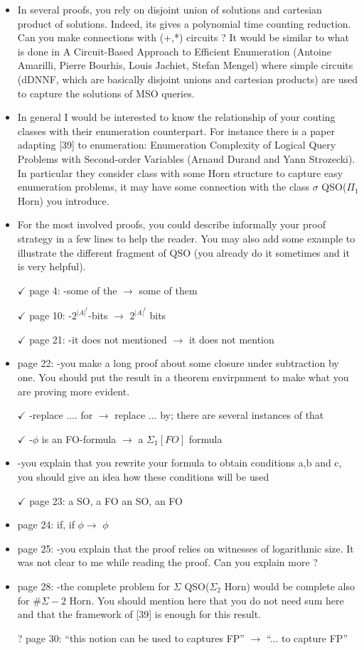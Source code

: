 \documentclass[a4paper]{article}
\begin{document}
\begin{itemize}
	\setlength\itemsep{0.5em}
	\item In several proofs, you rely on disjoint union of solutions and cartesian product of solutions. Indeed, its gives a polynomial time counting reduction. Can you make connections with (+,*) circuits ? It would be similar to what is done in A Circuit-Based Approach to Efficient Enumeration (Antoine Amarilli, Pierre Bourhis, Louis Jachiet, Stefan Mengel) where simple circuits (dDNNF, which are basically disjoint unions and cartesian products) are used to capture the solutions of MSO queries.
	
	\item In general I would be interested to know the relationship of your couting classes with their enumeration counterpart. 
	For instance there is a paper adapting [39] to enumeration: Enumeration Complexity of Logical Query Problems with Second-order Variables (Arnaud Durand and Yann Strozecki). In particular they consider class with some Horn structure to capture easy enumeration problems, it may have some connection with the class $\sigma$ QSO($\Pi_1$ Horn) you introduce.
	
	\item For the most involved proofs, you could describe informally your proof strategy in a few lines to help the reader. You may also add some example to illustrate the different fragment of QSO (you already do it sometimes and it is very helpful).
	
	\item[$\checkmark$] page 4:
	-some of the $\to$ some of them 
	\item[$\checkmark$] page 10: 
	-$2^{|A|^l}$-bits $\to$ $2^{|A|^l}$ bits
	\item[$\checkmark$] page 21:
	-it does not mentioned $\to$ it does not mention
	\item page 22: 
	-you make a long proof about some closure under subtraction by one.
	You should put the result in a theorem envirpnment to make what you are
	proving more evident.
	\item[$\checkmark$] -replace .... for $\to$ replace ... by;  there are several instances of
	that
	\item[$\checkmark$] -$\phi$ is an FO-formula $\to$ a $\Sigma_1[FO]$ formula
	\item -you explain that you rewrite your formula to obtain conditions a,b and c, 
	you should give an idea how these conditions will be used
	\item[$\checkmark$] page 23:
	a SO, a FO  an SO, an FO
	\item page 24: 
	if, if $\phi$$\to$ $\phi$
	\item page 25: 
	-you explain that the proof relies on witnesses of logarithmic size.
	It was not clear to me while reading the proof. Can you explain more ?
	\item page 28:
	-the complete problem for $\Sigma$ QSO($\Sigma_2$ Horn) would be complete also for $\#\Sigma-2$ Horn. You should mention here that you do not need sum here
	and that the framework of [39] is enough for this result.
	\item[?] page 30: ``this notion can be used to captures FP'' $\to$ ``... to capture FP''
	

\end{itemize}
\end{document}
